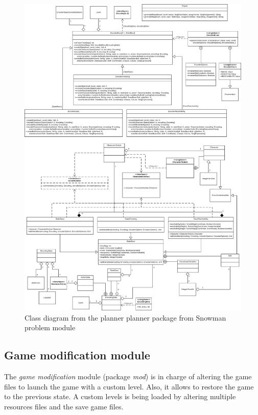 \documentclass{report}
\theoremstyle{plain}
\begin{document}
\begin{figure}
    \centering
    \includegraphics[width=\textwidth,height=0.93\textheight,keepaspectratio]{snowman-encoder-class-diagram.png}
    \caption{Class diagram from the planner planner package from Snowman problem module}
    \label{fig:snowman-encoder-class-diagram}
\end{figure}

\subsection{Game modification module}
The \emph{game modification} module (package \emph{mod}) is in charge of altering the game files to launch the game with a custom level. Also, it allows to restore the game to the previous state. A custom levels is being loaded by altering multiple resources files and the save game files.
\end{document}
